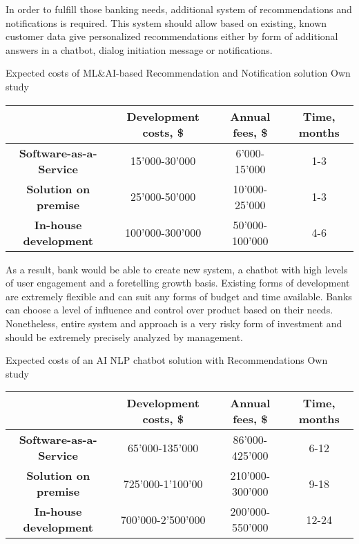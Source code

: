 In order to fulfill those banking needs, additional system of recommendations and notifications is required.
This system should allow based on existing, known customer data give personalized recommendations either by form of additional answers in a chatbot, dialog initiation message or notifications.

\mttable
{Expected costs of ML\&AI-based Recommendation and Notification solution}
{Own study}
{
    \begin{tabular}{| c | c | c | c |}
        \hline
        &
        \textbf{Development costs, \$} & 
        \textbf{Annual fees, \$} &
        \textbf{Time, months} \\ \hline 
       
        \textbf{Software-as-a-Service} & 
            15'000-30'000 & 
            6'000-15'000 &
            1-3 \\ \hline 
       
        \textbf{Solution on premise} & 
            25'000-50'000 &
            10'000-25'000 &
            1-3 \\ \hline 
            
        \textbf{In-house development} &
            100'000-300'000 &
            50'000-100'000 &
            4-6 \\ \hline
    \end{tabular}
}

As a result, bank would be able to create new system, a chatbot with high levels of user engagement and a foretelling growth basis.
Existing forms of development are extremely flexible and can suit any forms of budget and time available.
Banks can choose a level of influence and control over product based on their needs.
Nonetheless, entire system and approach is a very risky form of investment and should be extremely precisely analyzed by management.

\mttable
{Expected costs of an AI NLP chatbot solution with Recommendations}
{Own study}
{
    \begin{tabular}{| c | c | c | c |}
        \hline
        &
        \textbf{Development costs, \$} & 
        \textbf{Annual fees, \$} &
        \textbf{Time, months} \\ \hline 
       
        \textbf{Software-as-a-Service} & 
            65'000-135'000 & 
            86'000-425'000 &
            6-12 \\ \hline 
       
        \textbf{Solution on premise} & 
            725'000-1'100'00 &
            210'000-300'000 &
            9-18 \\ \hline 
            
        \textbf{In-house development} &
            700'000-2'500'000 &
            200'000-550'000 &
            12-24 \\ \hline
    \end{tabular}
}
